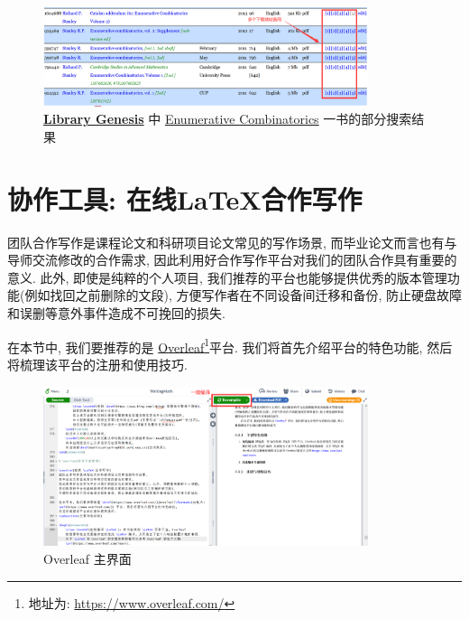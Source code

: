 \documentclass{formatBook}
\begin{document}
\begin{figure}[H]
    \centering
    \includegraphics[width=0.85\textwidth]{figure/ec.png}
    \caption{\textbf{\href{https://libgen.is/}{Library Genesis}} 中 \href{https://libgen.is/search.php?&req=Enumerative+Combinatorics&phrase=1&view=simple&column=def&sort=year&sortmode=DESC}{Enumerative Combinatorics} 一书的部分搜索结果}
    \label{fig:libgen}
\end{figure}

\section{协作工具: 在线\LaTeX 合作写作}
团队合作写作是课程论文和科研项目论文常见的写作场景, 而毕业论文而言也有与导师交流修改的合作需求, 因此利用好合作写作平台对我们的团队合作具有重要的意义. 此外, 即使是纯粹的个人项目, 我们推荐的平台也能够提供优秀的版本管理功能(例如找回之前删除的文段), 方便写作者在不同设备间迁移和备份, 防止硬盘故障和误删等意外事件造成不可挽回的损失.

在本节中, 我们要推荐的是 \href{https://www.overleaf.com/}{Overleaf}\footnote{地址为: \url{https://www.overleaf.com/}}平台. 我们将首先介绍平台的特色功能, 然后将梳理该平台的注册和使用技巧.

\begin{figure}[H]
    \centering
    \includegraphics[width=0.85\textwidth]{figure/overleafMain.png}
    \caption{Overleaf 主界面}
    \label{fig:overleafMain}
\end{figure}
\end{document}
